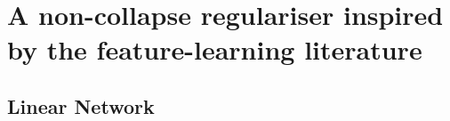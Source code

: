 \documentclass{article} %
\newcommand{\wa}{\mathbf{W}_1}
\newcommand{\wb}{\mathbf{W}_2}
\theoremstyle{remark}
\begin{document}










\appendix

\section{A non-collapse regulariser inspired by the feature-learning literature}
\label{app:theory}
\label{sec:exact_learning_dynamics}

\subsection{Linear Network}\label{app:linnet}
\end{document}
